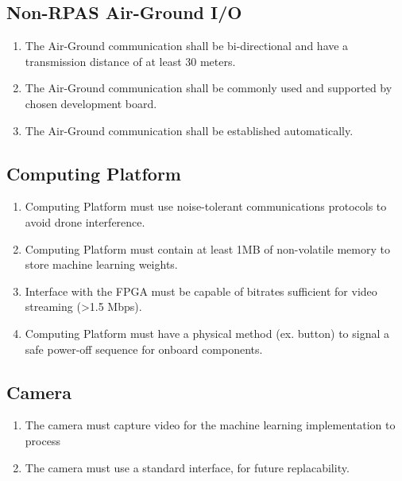\documentclass[10pt,letterpaper]{article}
\begin{document}
\subsection{Non-RPAS Air-Ground I/O}
\begin{enumerate}[label=F.CM.\arabic*, wide=1cm, widest=3cm, leftmargin=*, font=\bfseries, noitemsep,topsep=0pt, parsep=4pt, partopsep=0pt]
	\item The Air-Ground communication shall be bi-directional and have a transmission distance of at least 30 meters.
	\item The Air-Ground communication shall be commonly used and supported by chosen development board.
	\item The Air-Ground communication shall be established automatically.
\end{enumerate}

\subsection{Computing Platform}
\begin{enumerate}[label=F.CP.\arabic*, wide=1cm, widest=3cm, leftmargin=*, font=\bfseries, noitemsep,topsep=0pt, parsep=4pt, partopsep=0pt]
	\item Computing Platform must use noise-tolerant communications protocols to avoid drone interference.
	\item Computing Platform must contain at least 1MB of non-volatile memory to store machine learning weights.
	\item Interface with the FPGA must be capable of bitrates sufficient for video streaming (>1.5 Mbps).
	\item Computing Platform must have a physical method (ex. button) to signal a safe power-off sequence for onboard components.
\end{enumerate}

\subsection{Camera}
\begin{enumerate}[label=F.CAM.\arabic*, wide=1cm, widest=3cm, leftmargin=*, font=\bfseries, noitemsep,topsep=0pt, parsep=4pt, partopsep=0pt]
	\item The camera must capture video for the machine learning implementation to process
	\item The camera must use a standard interface, for future replacability.
\end{enumerate}
\end{document}

